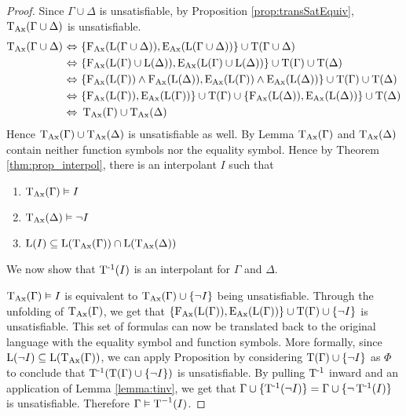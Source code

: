 		\interpolationRevThm*
		\begin{proof}%

			Since $\Gamma \cup \Delta$ is unsatisfiable,
			by Proposition \ref{prop:transSatEquiv}, $\TransAll(\Gamma \cup \Delta)$ is unsatisfiable.
			\begin{align*}
				\TransAll(\Gamma \cup \Delta)\,\semiff~&\{\FAX(\Lang(\Gamma\cup\Delta)), \EAX(\Lang(\Gamma \cup\Delta))\} \cup \Trans(\Gamma \cup \Delta) \\
				\semiff~&\{\FAX(\Lang(\Gamma)\cup\Lang(\Delta)), \EAX(\Lang(\Gamma)\cup\Lang(\Delta))\} \cup \Trans(\Gamma )\cup \Trans(\Delta) \\
				\semiff~&\{\FAX(\Lang(\Gamma)) \land \FAX(\Lang(\Delta)), \EAX(\Lang(\Gamma)) \land \EAX(\Lang(\Delta))\} \cup \Trans(\Gamma) \cup \Trans(\Delta) \\
				\semiff~&\{\FAX(\Lang(\Gamma)),\EAX(\Lang(\Gamma))\} \cup \Trans(\Gamma) \cup \{\FAX(\Lang(\Delta)), \EAX(\Lang(\Delta))\} \cup \Trans(\Delta) \\
				\semiff~&\TransAll(\Gamma) \cup \TransAll(\Delta)
			\end{align*}
			Hence  $\TransAll(\Gamma) \cup \TransAll(\Delta)$ is unsatisfiable as well.
			By Lemma  $\TransAll(\Gamma)$ and $\TransAll(\Delta)$ contain neither function symbols nor the equality symbol.
			Hence by Theorem \ref{thm:prop_interpol}, there is an interpolant $I$ such that
			\begin{enumerate}
				\item $\TransAll(\Gamma) \entails I$
				\item $\TransAll(\Delta) \entails \lnot I$ 
				\item $\Lang(I) \subseteq \Lang(\TransAll(\Gamma)) \cap \Lang(\TransAll(\Delta))$
					\label{proof:interpolation1_3}
			\end{enumerate}

			We now show that $\TransInv(I)$ is an interpolant for $\Gamma$ and $\Delta$.

			$\TransAll(\Gamma) \entails I$ is equivalent to $\TransAll(\Gamma) \cup \{\lnot I\}$ being unsatisfiable.
			Through the unfolding of $\TransAll(\Gamma)$, we get that 
			$\{\FAX(\Lang(\Gamma)), \EAX(\Lang(\Gamma))\} \cup \Trans(\Gamma) \cup \{\lnot I\}$ is unsatisfiable.
			This set of formulas can now be translated back to the original language with the equality symbol and function symbols. 
			More formally, 
			since $\Lang(\lnot I) \subseteq \Lang(\TransAll(\Gamma))$, we can apply Proposition
			by considering $\Trans(\Gamma) \cup \{\lnot I\}$ as $\Phi$ to conclude that $\TransInv(\Trans(\Gamma) \cup \{\lnot I\})$ is unsatisfiable. By pulling $\TransInv$ inward and an application of Lemma \ref{lemma:tinv}, we get that $\Gamma \cup \{\TransInv(\lnot I)\} = \Gamma \cup \{\lnot \TransInv(I)\}$ is unsatisfiable. 
			Therefore $\Gamma \entails \Trans^{-1}(I)$.


\end{proof}
